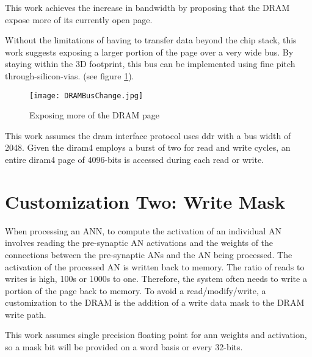 This work achieves the increase in bandwidth by proposing that the DRAM expose more of its currently open page.

Without the limitations of having to transfer data beyond the chip stack, this work suggests exposing a larger portion of the page over a very wide bus. By staying within the 3D footprint, this bus can be implemented using fine pitch through-silicon-vias.
(see figure \ref{fig:dramBusChange}).

\begin{figure}[!t]
\centering
\captionsetup{justification=centering}
\captionsetup{width=.9\linewidth}
\centerline{
\mbox{\texttt{[image: DRAMBusChange.jpg]}}
}
\caption{Exposing more of the DRAM page}
\label{fig:dramBusChange}
\end{figure}

This work assumes the \ac{dram} interface protocol uses \ac{ddr} with a bus width of 2048. Given the \ac{diram4} employs a burst of two for read and write cycles, an entire \ac{diram4} page of 4096-bits is accessed during each read or write. 

\section{Customization Two: Write Mask}
\label{sec:Write Mask}
When processing an ANN, to compute the activation of an individual AN involves reading the pre-synaptic AN activations and the weights of the connections between the pre-synaptic ANs and the AN being processed. The activation of the processed AN is written back to memory. The ratio of reads to writes is high, 100s or 1000s to one. Therefore, the system often needs to write a portion of the page back to memory. To avoid a read/modify/write, a customization to the DRAM is the addition of a write data mask to the DRAM write path.

This work assumes single precision floating point for \ac{ann} weights and activation, so a mask bit will be provided on a word basis or every 32-bits.

